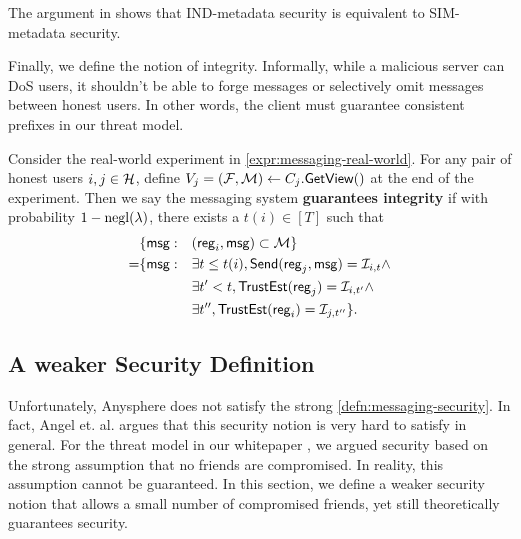 The argument in \cite[Appendix A]{shi2021non} shows that IND-metadata security is equivalent to SIM-metadata security.

Finally, we define the notion of integrity. Informally, while a malicious server can DoS users, it shouldn't be able to forge messages  or selectively omit messages between honest users. In other words, the client must guarantee consistent prefixes in our threat model.
\begin{definition}
\label{defn:messaging-integrity}
Consider the real-world experiment in \cref{expr:messaging-real-world}. For any pair of honest users $i, j \in \mathcal{H}$, define $V_j = (\mathcal{F}, \mathcal{M}) \leftarrow C_j.\mathsf{GetView}()$ at the end of the experiment. Then we say the messaging system \textbf{guarantees integrity} if with probability $1 - \operatorname{negl}(\lambda)$, there exists a $t(i) \in [T]$ such that
\begin{align*}
     &\{\mathsf{msg}: &&(\mathsf{reg}_i, \mathsf{msg}) \subset \mathcal{M}\} \\
      =& \{\mathsf{msg}: &&\exists t \leq t(i), \mathsf{Send}(\mathsf{reg}_j, \mathsf{msg}) = \mathcal{I}_{i, t} \land \\
          &   &&\exists t' < t, \mathsf{TrustEst}(\mathsf{reg}_j) = \mathcal{I}_{i, t'} \land \\
          &   &&\exists t'', \mathsf{TrustEst}(\mathsf{reg}_i) = \mathcal{I}_{j, t''}\}.
\end{align*}
\end{definition}

\subsection{A weaker Security Definition}
\label{subsec:messaging-security-weaker}
Unfortunately, Anysphere does not satisfy the strong \cref{defn:messaging-security}. In fact, Angel et. al. \cite{angel2018cf} argues that this security notion is very hard to satisfy in general. For the threat model in our whitepaper \cite{whitepaper}, we argued security based on the strong assumption that no friends are compromised. In reality, this assumption cannot be guaranteed. In this section, we define a weaker security notion that allows a small number of compromised friends, yet still theoretically guarantees security.



